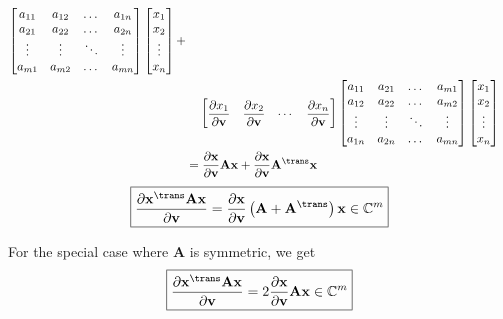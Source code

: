 \begin{align}
\begin{bmatrix}
        a_{11} & a_{12} & \dots & a_{1n} \\
        a_{21} & a_{22} & \dots & a_{2n} \\
        \vdots & \vdots & \ddots & \vdots \\
        a_{m1} & a_{m2} & \dots & a_{mn} \\
    \end{bmatrix}
    \begin{bmatrix}
        x_{1} \\ x_{2} \\ \vdots \\ x_{n}
    \end{bmatrix} + \nonumber \\
    & \hspace{2.5ex} \begin{bmatrix}
        \dfrac{\partial x_{1}}{\partial \mathbf{v}} & \dfrac{\partial x_{2}}{\partial \mathbf{v}} & \cdots  & \dfrac{\partial x_{n}}{\partial \mathbf{v}}
     \end{bmatrix}
     \begin{bmatrix}
         a_{11} & a_{21} & \dots & a_{m1} \\
         a_{12} & a_{22} & \dots & a_{m2} \\
         \vdots & \vdots & \ddots & \vdots \\
         a_{1n} & a_{2n} & \dots & a_{mn} \\
     \end{bmatrix}
     \begin{bmatrix}
         x_{1} \\ x_{2} \\ \vdots \\ x_{n}
     \end{bmatrix} \\
     & = \dfrac{\partial \mathbf{x}}{\partial \mathbf{v}}\mathbf{A} \mathbf{x} + \dfrac{\partial \mathbf{x}}{\partial \mathbf{v}}\mathbf{A}^\trans \mathbf{x}
\end{align}
\begin{align}
    \boxed{\dfrac{\partial \mathbf{x}^\trans \mathbf{A} \mathbf{x}}{\partial \mathbf{v}} = \dfrac{\partial \mathbf{x}}{\partial \mathbf{v}}\left( \mathbf{A} + \mathbf{A}^\trans \right) \mathbf{x} \in \mathbb{C}^{m}}
\end{align}

For the special case where \(\mathbf{A}\) is symmetric, we get
\begin{align}
    \boxed{\dfrac{\partial \mathbf{x}^\trans \mathbf{A} \mathbf{x}}{\partial \mathbf{v}} = 2\dfrac{\partial \mathbf{x}}{\partial \mathbf{v}}\mathbf{A} \mathbf{x} \in \mathbb{C}^{m}}
\end{align}

